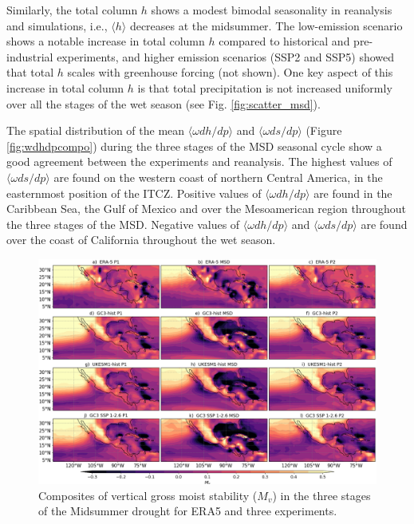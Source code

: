 Similarly, the total column $h$ shows a modest bimodal seasonality in reanalysis and simulations, i.e., $\langle h \rangle$ decreases at the midsummer. 
The low-emission scenario shows a notable increase in total column $h$ compared to historical and pre-industrial experiments, and higher emission scenarios (SSP2 and SSP5) showed that total $h$ scales with greenhouse forcing (not shown). One key aspect of this increase in total column $h$ is that total precipitation is not increased uniformly over all the stages of the wet season (see Fig. \ref{fig:scatter_msd}). 

The spatial distribution of the mean $\langle \omega dh/dp \rangle$ and $\langle \omega ds/dp \rangle$ (Figure \ref{fig:wdhdpcompo}) during the three stages of the MSD seasonal cycle show a good agreement between the experiments and reanalysis. The highest values of $\langle \omega ds/dp \rangle$ are found on the western coast of northern Central America, in the easternmost position of the ITCZ. Positive values of $\langle \omega dh/dp \rangle$  are found in the Caribbean Sea, the Gulf of Mexico and over the Mesoamerican region throughout the three stages of the MSD. Negative values of $\langle \omega dh/dp \rangle$ and $\langle \omega ds/dp \rangle$ are found over the coast of California throughout the wet season. 

\begin{figure}[t!]
\includegraphics[width=\linewidth]{figures/thermocompositeMvclim.png}
\caption[Composites of gross moist stability]{Composites of vertical gross moist stability ($M_v$) in the three stages of the Midsummer drought for ERA5 and three experiments.  }
\label{fig:Mvcompo}
\end{figure} 
 
